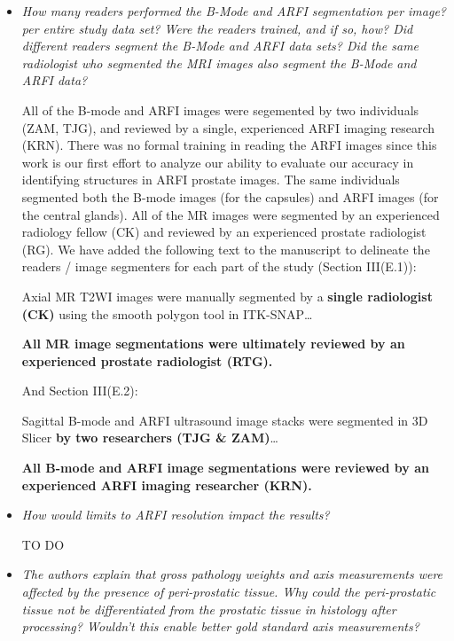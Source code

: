\documentclass[10pt]{article}
\begin{document}
\begin{itemize}
    \item \textit{How many readers performed the B-Mode and ARFI segmentation
            per image? per entire study data set? Were the readers trained, and
            if so, how?  Did different readers segment the B-Mode and ARFI data
            sets?  Did the same radiologist who segmented the MRI images also
            segment the B-Mode and ARFI data?}

    All of the B-mode and ARFI images were segemented by two individuals (ZAM,
    TJG), and reviewed by a single, experienced ARFI imaging research (KRN).
    There was no formal training in reading the ARFI images since this work is
    our first effort to analyze our ability to evaluate our accuracy in
    identifying structures in ARFI prostate images.  The same individuals
    segmented both the B-mode images (for the capsules) and ARFI images (for
    the central glands).  All of the MR images were segmented by an experienced
    radiology fellow (CK) and reviewed by an experienced prostate radiologist
    (RG).  We have added the following text to the manuscript to delineate the
    readers / image segmenters for each part of the study (Section III(E.1)):

    Axial MR T2WI images were manually segmented by a \textbf{single
        radiologist (CK)} using the smooth polygon tool in ITK-SNAP\ldots

    \textbf{All MR image segmentations were ultimately reviewed by an
        experienced prostate radiologist (RTG).}

    And Section III(E.2):

    Sagittal B-mode and ARFI ultrasound image stacks were segmented in 3D
    Slicer \textbf{by two researchers (TJG \& ZAM)}\ldots

    \textbf{All B-mode and ARFI image segmentations were reviewed by an
        experienced ARFI imaging researcher (KRN).}


    \item \textit{How would limits to ARFI resolution impact the results?}

    TO DO

    \item \textit{The authors explain that gross pathology weights and axis
            measurements were affected by the presence of peri-prostatic
            tissue.  Why could the peri-prostatic tissue not be differentiated
            from the prostatic tissue in histology after processing?  Wouldn't
            this enable better gold standard axis measurements?}


\end{itemize}
\end{document}
